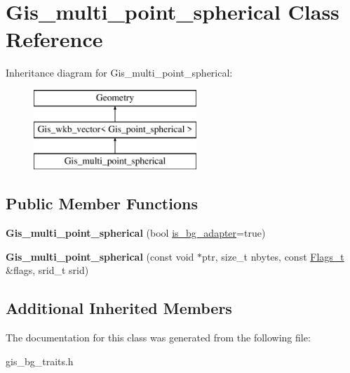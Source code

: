 \hypertarget{classGis__multi__point__spherical}{}\section{Gis\+\_\+multi\+\_\+point\+\_\+spherical Class Reference}
\label{classGis__multi__point__spherical}
Inheritance diagram for Gis\+\_\+multi\+\_\+point\+\_\+spherical\+:\begin{figure}[H]
\begin{center}
\leavevmode
\includegraphics[height=3.000000cm]{classGis__multi__point__spherical}
\end{center}
\end{figure}
\subsection*{Public Member Functions}
\begin{DoxyCompactItemize}
\item 
\mbox{\label{classGis__multi__point__spherical_a592d939ebc85a0b0be3115ab073d6084}} 
{\bfseries Gis\+\_\+multi\+\_\+point\+\_\+spherical} (bool \mbox{\hyperlink{classGeometry_ada614004627a9e7af129e51a34242af9}{is\+\_\+bg\+\_\+adapter}}=true)
\item 
\mbox{\label{classGis__multi__point__spherical_a884f2da4d865ab6bff7bf899bc500578}} 
{\bfseries Gis\+\_\+multi\+\_\+point\+\_\+spherical} (const void $\ast$ptr, size\+\_\+t nbytes, const \mbox{\hyperlink{classGeometry_1_1Flags__t}{Flags\+\_\+t}} \&flags, srid\+\_\+t srid)
\end{DoxyCompactItemize}
\subsection*{Additional Inherited Members}


The documentation for this class was generated from the following file\+:\begin{DoxyCompactItemize}
\item 
gis\+\_\+bg\+\_\+traits.\+h\end{DoxyCompactItemize}
